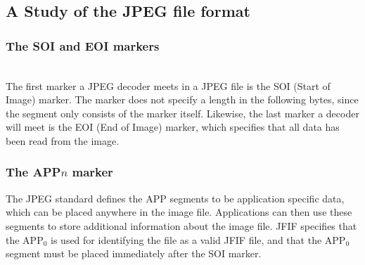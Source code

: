 \begin{infobox}{\section[A Study of the JPEG file format]{A Study of the JPEG file format}}
\subsubsection*{The SOI and EOI markers}
\begin{centering}
\hspace{1.2cm} 
\end{centering}\\
The first marker a JPEG decoder meets in a JPEG file is the SOI (Start of Image) marker. The marker does not specify a length in the following bytes, since the segment only consists of the marker itself. Likewise, the last marker a decoder will meet is the EOI (End of Image) marker, which specifies that all data has been read from the image.

\subsubsection*{The APP$n$ marker}
\begin{centering}
\end{centering}
The JPEG standard defines the APP segments to be application specific data, which can be placed anywhere in the image file. Applications can then use these segments to store additional information about the image file. JFIF specifies that the APP$_0$ is used for identifying the file as a valid JFIF file, and that the APP$_0$ segment must be placed immediately after the SOI marker.


\end{infobox}
